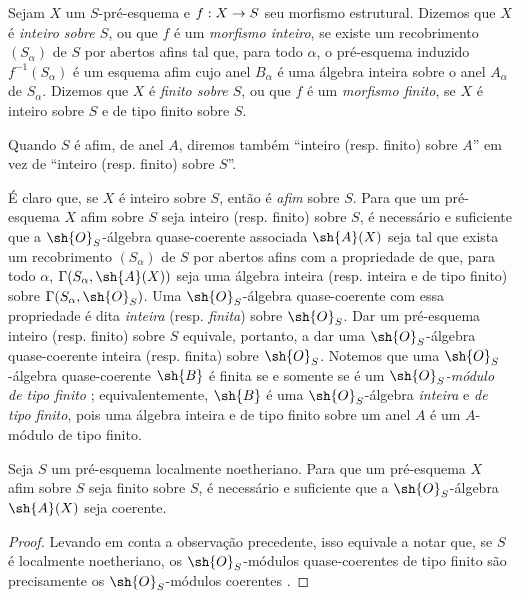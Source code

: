 \documentclass[oneside,10pt]{amsart}
\makeatletter
\newcommand{\ega@arrow}[2]{\mathchoice{#1}{#2}{#2}{#2}}
\renewcommand{\to}{\ega@arrow{\longrightarrow}{\rightarrow}}
\let\EGAOriginalLabel\label
\renewcommand{\label}[1]{\phantomsection\EGAOriginalLabel{#1}}
\makeatother
\begin{document}
\begin{definition}[6.1.1]
\label{II.6.1.1}
Sejam $X$ um $S$-pré-esquema e $f:X\to S$ seu morfismo estrutural.
Dizemos que $X$ é \emph{inteiro sobre $S$}, ou que $f$ é um \emph{morfismo inteiro}, se existe um recobrimento $(S_\alpha)$ de $S$ por abertos afins tal que, para todo $\alpha$, o pré-esquema induzido $f^{-1}(S_\alpha)$ é um esquema afim cujo anel $B_\alpha$ é uma álgebra inteira sobre o anel $A_\alpha$ de $S_\alpha$.
Dizemos que $X$ é \emph{finito sobre $S$}, ou que $f$ é um \emph{morfismo finito}, se $X$ é inteiro sobre $S$ e de tipo finito sobre $S$.
\end{definition}

Quando $S$ é afim, de anel $A$, diremos também ``inteiro (resp. finito) sobre $A$'' em vez de ``inteiro (resp. finito) sobre $S$''.

\begin{env}[6.1.2]
\label{II.6.1.2}
É claro que, se $X$ é inteiro sobre $S$, então é \emph{afim} sobre $S$.
Para que um pré-esquema $X$ afim sobre $S$ seja inteiro (resp. finito) sobre $S$, é necessário e suficiente que a $\sh{O}_S$-álgebra quase-coerente associada $\sh{A}(X)$ seja tal que exista um recobrimento $(S_\alpha)$ de $S$ por abertos afins com a propriedade de que, para todo $\alpha$, $\Gamma(S_\alpha,\sh{A}(X))$ seja uma álgebra inteira (resp. inteira e de tipo finito) sobre $\Gamma(S_\alpha,\sh{O}_S)$.
Uma $\sh{O}_S$-álgebra quase-coerente com essa propriedade é dita \emph{inteira} (resp. \emph{finita}) sobre $\sh{O}_S$.
Dar um pré-esquema inteiro (resp. finito) sobre $S$ equivale, portanto,  a dar uma $\sh{O}_S$-álgebra quase-coerente inteira (resp. finita) sobre $\sh{O}_S$.
Notemos que uma $\sh{O}_S$-álgebra quase-coerente $\sh{B}$ é finita se e somente se é um \emph{$\sh{O}_S$-módulo de tipo finito} ;
equivalentemente, $\sh{B}$ é uma $\sh{O}_S$-álgebra \emph{inteira} e \emph{de tipo finito}, pois uma álgebra inteira e de tipo finito sobre um anel $A$ é um $A$-módulo de tipo finito.
\end{env}

\begin{proposition}[6.1.3]
\label{II.6.1.3}
Seja $S$ um pré-esquema localmente noetheriano.
Para que um pré-esquema $X$ afim sobre $S$ seja finito sobre $S$, é necessário e suficiente que a $\sh{O}_S$-álgebra $\sh{A}(X)$ seja coerente.
\end{proposition}
\begin{proof}
Levando em conta a observação precedente, isso equivale a notar que, se $S$ é localmente noetheriano, os $\sh{O}_S$-módulos quase-coerentes de tipo finito são precisamente os $\sh{O}_S$-módulos coerentes .
\end{proof}
\end{document}
